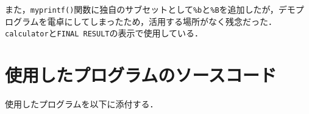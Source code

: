 また，\verb|myprintf()|関数に独自のサブセットとして\verb|%b|と\verb|%B|を追加したが，デモプログラムを電卓にしてしまったため，活用する場所がなく残念だった．\verb|calculator|と\verb|FINAL RESULT|の表示で使用している．

\section{使用したプログラムのソースコード} \label{sec:makep}

使用したプログラムを以下に添付する．


